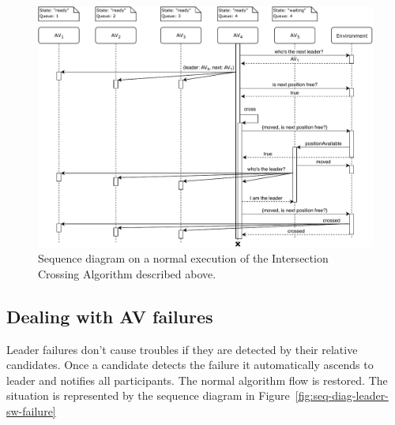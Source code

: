 \documentclass{memoir}
\begin{document}
\begin{figure}
	\centering
	\includegraphics[width=\linewidth]{sequence_diagrams/crossing_intersection.pdf}
	\caption{Sequence diagram on a normal execution of the Intersection Crossing Algorithm described above.}
	\label{fig:seq-diag-crossing-intersection}
\end{figure}

\subsection{Dealing with AV failures}

Leader failures don't cause troubles if they are detected by their relative candidates. Once a candidate detects the failure it automatically ascends to leader and notifies all participants. The normal algorithm flow is restored. The situation is represented by the sequence diagram in Figure~\ref{fig:seq-diag-leader-sw-failure}
\end{document}
